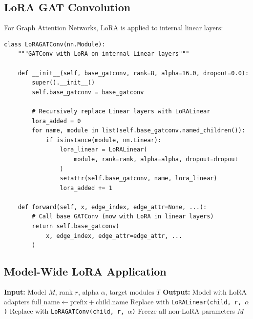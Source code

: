 \documentclass[11pt,a4paper]{article}
\begin{document}
\subsection{LoRA GAT Convolution}

For Graph Attention Networks, LoRA is applied to internal linear layers:

\begin{lstlisting}[caption={LoRA GATConv (lines 163-216)}]
class LoRAGATConv(nn.Module):
    """GATConv with LoRA on internal Linear layers"""

    def __init__(self, base_gatconv, rank=8, alpha=16.0, dropout=0.0):
        super().__init__()
        self.base_gatconv = base_gatconv

        # Recursively replace Linear layers with LoRALinear
        lora_added = 0
        for name, module in list(self.base_gatconv.named_children()):
            if isinstance(module, nn.Linear):
                lora_linear = LoRALinear(
                    module, rank=rank, alpha=alpha, dropout=dropout
                )
                setattr(self.base_gatconv, name, lora_linear)
                lora_added += 1

    def forward(self, x, edge_index, edge_attr=None, ...):
        # Call base GATConv (now with LoRA in linear layers)
        return self.base_gatconv(
            x, edge_index, edge_attr=edge_attr, ...
        )
\end{lstlisting}

\subsection{Model-Wide LoRA Application}

\begin{algorithm}
\caption{Add LoRA to Model}
\begin{algorithmic}[1]
\State \textbf{Input:} Model $M$, rank $r$, alpha $\alpha$, target modules $T$
\State \textbf{Output:} Model with LoRA adapters
\State
{}
        \State $\text{full\_name} \gets \text{prefix} + \text{child.name}$
                \State Replace with \texttt{LoRALinear(child, r, $\alpha$)}
                \State Replace with \texttt{LoRAGATConv(child, r, $\alpha$)}
            \Else
                \State {}
            \EndIf
        \Else
            \State {}
        \EndIf
    \EndFor
\EndFunction
\State
\State {}
\State Freeze all non-LoRA parameters
\State \Return $M$
\end{algorithmic}
\end{algorithm}
\end{document}
